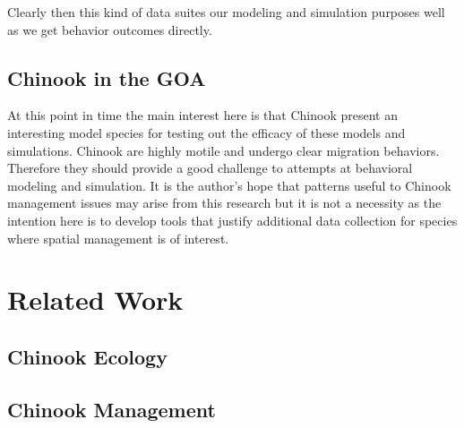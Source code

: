 \documentclass[11pt]{article}
\begin{document}
Clearly then this kind of data suites our modeling and simulation purposes well as we get behavior outcomes directly. 

\subsection{Chinook in the GOA}

At this point in time the main interest here is that Chinook present an interesting model species for testing out the efficacy of these models and simulations. Chinook are highly motile and undergo clear migration behaviors. Therefore they should provide a good challenge to attempts at behavioral modeling and simulation. It is the author's hope that patterns useful to Chinook management issues may arise from this research but it is not a necessity as the intention here is to develop tools that justify additional data collection for species where spatial management is of interest. 





























\newpage















\section{Related Work}

\subsection{Chinook Ecology}

\subsection{Chinook Management}
\end{document}
